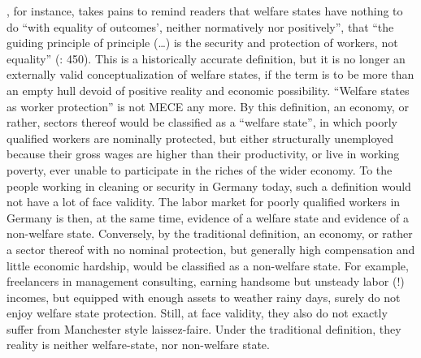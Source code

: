\begin{enumerate}
	\citeauthor{Offe2003}, for instance, takes pains to remind readers that welfare states have nothing to do ``with equality of outcomes', neither normatively nor positively'', that ``the guiding principle of principle (\ldots) is the security and protection of workers, not equality'' (\citeyear{Offe2003}: 450). This is a historically accurate definition, but it is no longer an externally valid conceptualization of welfare states, if the term is to be more than an empty hull devoid of positive reality and economic possibility. ``Welfare states as worker protection'' is not \gls{MECE} any more. By this definition, an economy, or rather, sectors thereof would be classified as a ``welfare state'', in which poorly qualified workers are nominally protected, but either structurally unemployed because their gross wages are higher than their productivity, or live in working poverty, ever unable to participate in the riches of the wider economy. To the people working in cleaning or security in Germany today, such a definition would not have a lot of face validity. The labor market for poorly qualified workers in Germany is then, at the same time, evidence of a welfare state and evidence of a non-welfare state. Conversely, by the traditional definition, an economy, or rather a sector thereof with no nominal protection, but generally high compensation and little economic hardship, would be classified as a non-welfare state. For example, freelancers in management consulting, earning handsome but unsteady labor (!) incomes, but equipped with enough assets to weather rainy days, surely do not enjoy welfare state protection. Still, at face validity, they also do not exactly suffer from Manchester style laissez-faire. Under the traditional definition, they reality is neither welfare-state, nor non-welfare state.


\end{enumerate}
